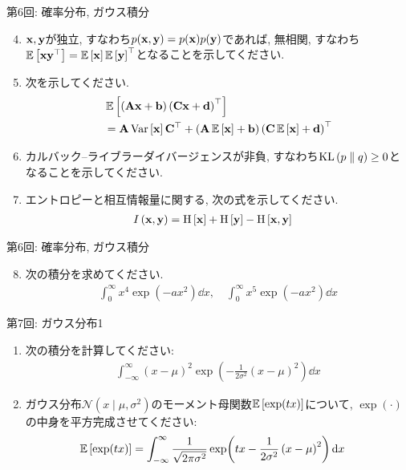 \documentclass[dvipdfmx,notheorems,t]{beamer}
\begin{document}
\begin{frame}{第6回: 確率分布, ガウス積分}
\begin{enumerate}
  \setcounter{enumi}{3}
  \item $\vb{x}, \vb{y}$が独立, すなわち$p(\vb{x}, \vb{y}) = p(\vb{x}) p(\vb{y})$であれば,
  無相関, すなわち$\operatorname{\mathbb{E}} \left[ \vb{x} \vb{y}^\top \right] = \operatorname{\mathbb{E}} \left[ \vb{x} \right] \operatorname{\mathbb{E}} \left[ \vb{y} \right]^\top$となることを示してください.

  \item 次を示してください.
  \begin{align*}
    & \operatorname{\mathbb{E}} \left[ \left( \vb{A} \vb{x} + \vb{b} \right) \left( \vb{C} \vb{x} + \vb{d} \right)^\top \right] \\
    &= \vb{A} \operatorname{Var} \left[ \vb{x} \right] \vb{C}^\top
    + \left( \vb{A} \operatorname{\mathbb{E}} \left[ \vb{x} \right] + \vb{b} \right)
      \left( \vb{C} \operatorname{\mathbb{E}} \left[ \vb{x} \right] + \vb{d} \right)^\top
  \end{align*}

  \item カルバック--ライブラーダイバージェンスが非負, すなわち$\operatorname{KL} \left( p \parallel q \right) \ge 0$となることを示してください.

  \item エントロピーと相互情報量に関する, 次の式を示してください.
  \begin{align*}
    I \left( \vb{x}, \vb{y} \right) &= \operatorname{H} \left[ \vb{x} \right] + \operatorname{H} \left[ \vb{y} \right] - \operatorname{H} \left[ \vb{x}, \vb{y} \right]
  \end{align*}
\end{enumerate}
\end{frame}

\begin{frame}{第6回: 確率分布, ガウス積分}
\begin{enumerate}
  \setcounter{enumi}{7}
  \item 次の積分を求めてください.
  \begin{align*}
    \int_0^\infty x^4 \exp(-a x^2) \dd{x}, \quad \int_0^\infty x^5 \exp(-a x^2) \dd{x}
  \end{align*}
\end{enumerate}
\end{frame}

\begin{frame}{第7回: ガウス分布1}
\begin{enumerate}
  \item 次の積分を計算してください:
  \begin{align*}
    \int_{-\infty}^\infty (x - \mu)^2
      \exp \left( -\frac{1}{2 \sigma^2} \left( x - \mu \right)^2 \right) \dd{x}
  \end{align*}

  \item ガウス分布$\mathcal{N}(x \mid \mu, \sigma^2)$のモーメント母関数$\operatorname{\mathbb{E}} \left[ \exp(tx) \right]$について,
  $\exp(\cdot)$の中身を平方完成させてください:
  \begin{align*}
    \operatorname{\mathbb{E}} \left[ \exp(tx) \right] &= \int_{-\infty}^\infty \frac{1}{\sqrt{2\pi \sigma^2}}
      \exp(tx -\frac{1}{2 \sigma^2} \left( x - \mu \right)^2) \dd{x}
  \end{align*}
\end{enumerate}
\end{frame}
\end{document}
